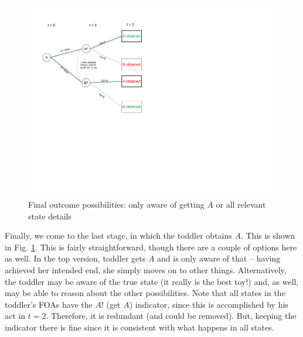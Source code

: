 \documentclass[
11pt,
titlepage,
reqno,
]{article}%
\theoremstyle{definition}
\begin{document}
\begin{figure}[h!]
	\centering
	\includegraphics*[page=20,trim = 0in 0in 2in 0in,scale=.65]{Awareness_Diagrams_All}
	\caption{Final outcome possibilities: only aware of getting $A$ or all relevant state details\label{Diag: p-20}}%
\end{figure}

Finally, we come to the last stage, in which the toddler obtains $A$. This is shown in Fig. \ref{Diag: p-20}. This is fairly straightforward, though there are a couple of options here as well. In the top version, toddler gets $A$ and is only aware of that -- having achieved her intended end, she simply moves on to other things. Alternatively, the toddler may be aware of the true state (it really is the best toy!) and, as well, may be able to reason about the other possibilities. Note that all states in the toddler's FOAs have the $A!$ (get $A$) indicator, since this is accomplished by his act in $t=2$. Therefore, it is redundant (and could be removed). But, keeping the indicator there is fine since it is consistent with what happens in all states. 


\end{document}
